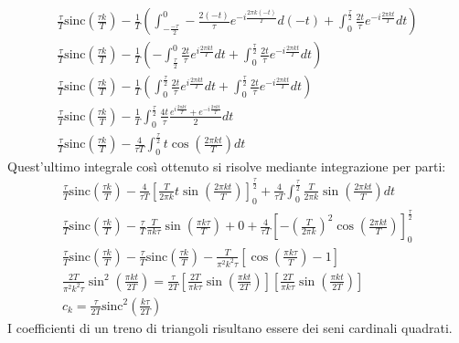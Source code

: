 \documentclass{article}
\numberwithin{equation}{subsection}
\begin{document}
\begin{gather*}
    \displaystyle\frac{\tau}{T}\mbox{sinc}\left(\frac{\tau k}{T}\right)-\frac{1}{T}\left(\int_{-\frac{-\tau}{2}}^{0}-\frac{2(-t)}{\tau}e^{-i\frac{2\pi k(-t)}{T}}d(-t)+\int_{0}^{\frac{\tau}{2}}\frac{2t}{\tau}e^{-i\frac{2\pi kt}{T}}dt\right)\\
    \displaystyle\frac{\tau}{T}\mbox{sinc}\left(\frac{\tau k}{T}\right)-\frac{1}{T}\left(-\int_{\frac{\tau}{2}}^{0}\frac{2t}{\tau}e^{i\frac{2\pi kt}{T}}dt+\int_{0}^{\frac{\tau}{2}}\frac{2t}{\tau}e^{-i\frac{2\pi kt}{T}}dt\right)\\
    \displaystyle\frac{\tau}{T}\mbox{sinc}\left(\frac{\tau k}{T}\right)-\frac{1}{T}\left(\int^{\frac{\tau}{2}}_{0}\frac{2t}{\tau}e^{i\frac{2\pi kt}{T}}dt+\int_{0}^{\frac{\tau}{2}}\frac{2t}{\tau}e^{-i\frac{2\pi kt}{T}}dt\right)\\
    \displaystyle\frac{\tau}{T}\mbox{sinc}\left(\frac{\tau k}{T}\right)-\frac{1}{T}\int^{\frac{\tau}{2}}_{0}\frac{4t}{\tau}\frac{e^{i\frac{2\pi kt}{T}}+e^{-i\frac{2\pi kt}{T}}}{2}dt\\
    \displaystyle\frac{\tau}{T}\mbox{sinc}\left(\frac{\tau k}{T}\right)-\frac{4}{\tau T}\int_{0}^{\frac{\tau}{2}}t\cos\left(\frac{2\pi kt}{T}\right)dt
\end{gather*}
Quest'ultimo integrale così ottenuto si risolve mediante integrazione per parti:
\begin{gather*}
    \displaystyle\frac{\tau}{T}\mbox{sinc}\left(\frac{\tau k}{T}\right)-\frac{4}{\tau T}\left[\frac{T}{2\pi k}t\sin\left(\frac{2\pi kt}{T}\right)\right]^{\frac{\tau}{2}}_0
    +\frac{4}{\tau T}\int_{0}^{\frac{\tau}{2}}\frac{T}{2\pi k}\sin\left(\frac{2\pi kt}{T}\right)dt\\
    \displaystyle\frac{\tau}{T}\mbox{sinc}\left(\frac{\tau k}{T}\right)-\frac{\tau}{T}\frac{T}{\pi k\tau}\sin\left(\frac{\pi k\tau}{T}\right)+0+
    \frac{4}{\tau T}\left[-\left(\frac{T}{2\pi k}\right)^2\cos\left(\frac{2\pi kt}{T}\right)\right]^{\frac{\tau}{2}}_0\\
    \displaystyle\frac{\tau}{T}\mbox{sinc}\left(\frac{\tau k}{T}\right)-\displaystyle\frac{\tau}{T}\mbox{sinc}\left(\frac{\tau k}{T}\right)-
    \frac{T}{\pi^2k^2\tau}\left[\cos\left(\frac{\pi k\tau}{T}\right)-1\right]\\
    \displaystyle\frac{2T}{\pi^2k^2\tau}\sin^2\left(\frac{\pi kt}{2T}\right)=
    \frac{\tau}{2T}\left[\frac{2T}{\pi k\tau}\sin\left(\frac{\pi kt}{2T}\right)\right]\left[\frac{2T}{\pi k\tau}\sin\left(\frac{\pi kt}{2T}\right)\right]\\
    c_k=\displaystyle\frac{\tau}{2T}\mbox{sinc}^2\left(\frac{k\tau }{2T}\right)
\end{gather*}
I coefficienti di un treno di triangoli risultano essere dei seni cardinali quadrati. 
\end{document}
